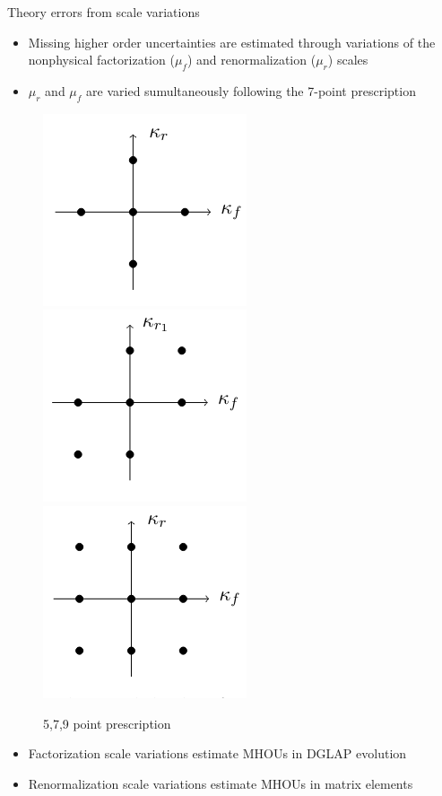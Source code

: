 \documentclass[aspectratio=169, 9pt,t]{beamer}
\begin{document}
\begin{frame}{Theory errors from scale variations}
  \begin{itemize}
    \item Missing higher order uncertainties are estimated through variations of the nonphysical factorization ($\mu_f$) and renormalization ($\mu_r$) scales
    \item $\mu_r$ and $\mu_f$ are varied sumultaneously following the 7-point prescription
  \end{itemize}
  \begin{figure}
    \includegraphics[width=.2\textwidth]{figures/5point.png}
    \includegraphics[width=.2\textwidth]{figures/7point.png}
    \includegraphics[width=.2\textwidth]{figures/9point.png}
    \caption*{5,7,9 point prescription}
  \end{figure}
  \begin{itemize}
    \item Factorization scale variations estimate MHOUs in DGLAP evolution
    \item Renormalization scale variations estimate MHOUs in matrix elements
  \end{itemize}
\end{frame}
\end{document}

